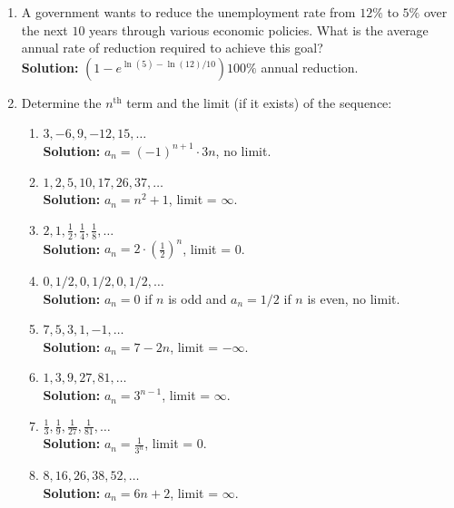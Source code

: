 \documentclass{article}
\begin{document}
\begin{enumerate}[leftmargin = 0.5cm, label = \arabic*., rightmargin = 0.2cm]

    \item A government wants to reduce the unemployment rate from $12\%$ to $5\%$ over the next $10$ years through various economic policies. What is the average annual rate of reduction required to achieve this goal? \\
    \textbf{Solution:} $(1 - e^{\ln(5) - \ln(12) / 10})100\%$ annual reduction.

    \item Determine the $n^{\text{th}}$ term and the limit (if it exists) of the sequence:

    \begin{enumerate}[leftmargin = 0.5cm, label = (\alph*), rightmargin = 0.2cm]
        \item $3, -6, 9, -12, 15, \dots$ \\
        \textbf{Solution:} $a_n = (-1)^{n+1} \cdot 3n$, no limit.
        
        \item $1, 2, 5, 10, 17, 26, 37, \dots$ \\
        \textbf{Solution:} $a_n = n^2 + 1$, limit = $\infty$.

        \item $2, 1, \frac{1}{2}, \frac{1}{4}, \frac{1}{8}, \dots$ \\
        \textbf{Solution:} $a_n = 2 \cdot \left( \frac{1}{2} \right)^n$, limit = 0.

        \item $0, 1/2, 0, 1/2, 0, 1/2, \dots$ \\
        \textbf{Solution:} $a_n = 0$ if $n$ is odd and $a_n = 1/2$ if $n$ is even, no limit.

        \item $7, 5, 3, 1, -1, \dots$ \\
        \textbf{Solution:} $a_n = 7 - 2n$, limit = $-\infty$.

        \item $1, 3, 9, 27, 81, \dots$ \\
        \textbf{Solution:} $a_n = 3^{n-1}$, limit = $\infty$.

        \item $\frac{1}{3}, \frac{1}{9}, \frac{1}{27}, \frac{1}{81}, \dots$ \\
        \textbf{Solution:} $a_n = \frac{1}{3^n}$, limit = 0.

        \item $8, 16, 26, 38, 52, \dots$ \\
        \textbf{Solution:} $a_n = 6n + 2$, limit = $\infty$.


\end{enumerate}
\end{enumerate}
\end{document}
